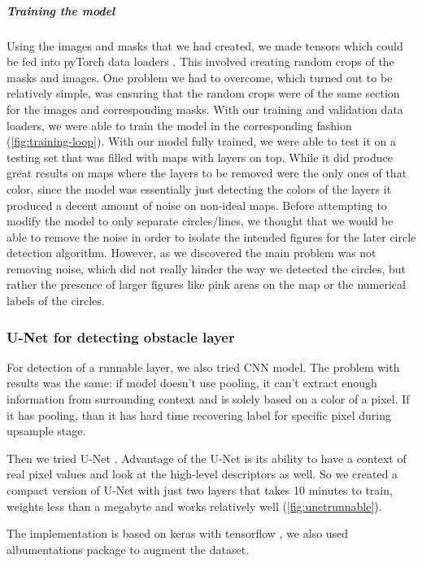 \documentclass[a4paper,12pt]{extarticle}
\begin{document}
\subparagraph{Training the model\\}
Using the images and masks that we had created, we made tensors which could be fed into pyTorch data loaders \cite{pytorch}.
This involved creating random crops of the masks and images. One problem we had to overcome, which turned out to be relatively simple, was ensuring that the random crops were of the same section for the images and corresponding masks. With our training and validation data loaders, we were able to train the model in the corresponding fashion (\cref{fig:training-loop}).
With our model fully trained, we were able to test it on a testing set that was filled with maps with layers on top.
While it did produce great results on maps where the layers to be removed were the only ones of that color, since the model was essentially just detecting the colors of the layers it produced a decent amount of noise on non-ideal maps. Before attempting to modify the model to only separate circles/lines, we thought that we would be able to remove the noise in order to isolate the intended figures for the later circle detection algorithm. However, as we discovered the main problem was not removing noise, which did not really hinder the way we detected the circles, but rather the presence of larger figures like pink areas on the map or the numerical labels of the circles. 

\subsubsection{U-Net for detecting obstacle layer}

For detection of a runnable layer, we also tried CNN model.
The problem with results was the same: if model doesn't use pooling, it can't extract enough information from surrounding context and is solely based on a color of a pixel.
If it has pooling, than it has hard time recovering label for specific pixel during upsample stage.

Then we tried U-Net \cite{unet}. Advantage of the U-Net is its ability to have a context of real pixel values and look at the high-level descriptors as well.
So we created a compact version of U-Net with just two layers that takes 10 minutes to train, weights less than a megabyte and works relatively well (\cref{fig:unetrunnable}).

The implementation is based on keras with tensorflow \cite{keras}, we also used albumentations \cite{albumentations} package to augment the dataset.
\end{document}
